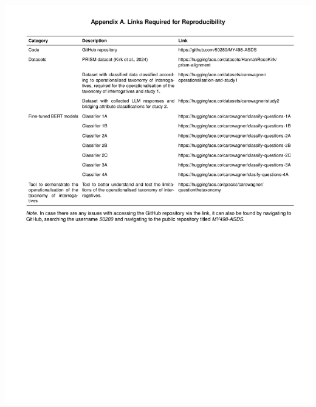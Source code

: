 \documentclass[
  12pt,
]{article}
\begin{document}
\begin{center}\includegraphics{../03_outputs/04_appendices/appendix_a} \end{center}
\end{document}

